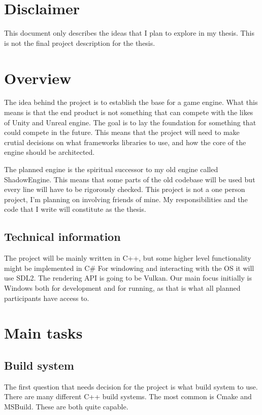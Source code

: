 \chapter{Disclaimer}

This document only describes the ideas that I plan to explore in my thesis. 
This is not the final project description for the thesis.

\chapter{Overview}

The idea behind the project is to establish the base for a game engine. 
What this means is that the end product is not something that can compete with the likes of Unity and Unreal engine.
The goal is to lay the foundation for something that could compete in the future.
This means that the project will need to make crutial decisions on what frameworks libraries to use, and how the core of the engine should be architected.

The planned engine is the spiritual successor to my old engine called ShadowEngine. 
This means that some parts of the old codebase will be used but every line will have to be rigorously checked.
This project is not a one person project, I'm planning on involving friends of mine. My responsibilities and the code that I write will constitute as the thesis.

\section{Technical information}
The project will be mainly written in C++, but some higher level functionality might be implemented in C# For windowing and interacting with the OS it will use SDL2.
The rendering API is going to be Vulkan.
Our main focus initially is Windows both for development and for running, as that is what all planned participants have access to.

\chapter{Main tasks}
\section{Build system}
The first question that needs decision for the project is what build system to use.
There are many different C++ build systems. The most common is Cmake and MSBuild. These are both quite capable.
